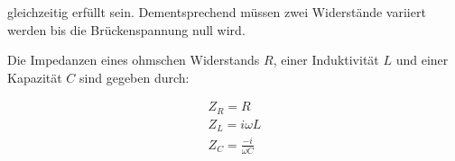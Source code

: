 gleichzeitig erfüllt sein. Dementsprechend müssen zwei Widerstände
variiert werden bis die Brückenspannung null wird.

Die Impedanzen eines ohmschen Widerstands $R$, einer Induktivität $L$
und einer Kapazität $C$ sind gegeben durch: 

\begin{gather}
Z_R = R \\
Z_L = i\omega L \\
Z_C = \frac{-i}{\omega C}
\end{gather}

\cite{sample}
